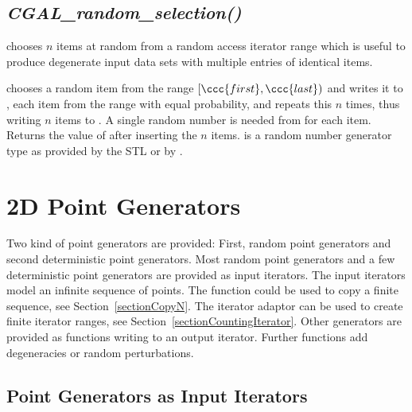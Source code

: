 \subsection{{\it CGAL\_random\_selection()}}
\label{sectionRandomSelection}

 chooses $n$ items at random from a random
access iterator range which is useful to produce degenerate input data
sets with multiple entries of identical items.


{ chooses a random item from the range $[\ccc{first},\ccc{last})$ and
    writes it to , each item from the range with equal
    probability, and repeats this $n$ times, thus writing $n$ items to
    .
    A single random number is needed from  for each item.
    Returns the value of  after inserting the $n$ items.
    \ccPrecond {} is a random number generator type as provided 
    by the STL or by .
}


\newpage
\section{2D Point Generators}

Two kind of point generators are provided: First, random point
generators and second deterministic point generators. Most random
point generators and a few deterministic point generators are provided
as input iterators.  The input iterators model an infinite sequence of
points. The function  could be used to copy a
finite sequence, see Section~\ref{sectionCopyN}. The iterator adaptor
 can be used to create finite iterator
ranges, see Section~\ref{sectionCountingIterator}.
Other generators are provided as functions writing to an output
iterator. Further functions add degeneracies or random perturbations.


\subsection{Point Generators as Input Iterators}

